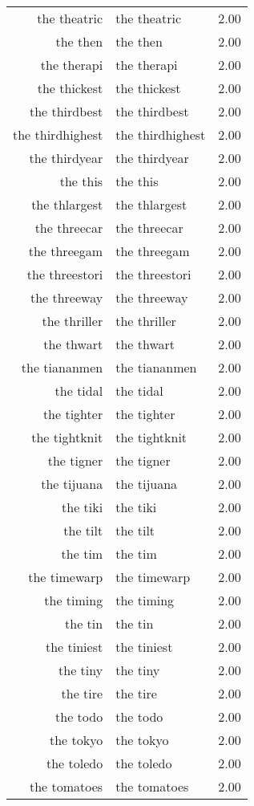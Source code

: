 \begin{table}[ht]
\begin{tabular}{rlr}
  the theatric & the theatric & 2.00 \\ 
  the then & the then & 2.00 \\ 
  the therapi & the therapi & 2.00 \\ 
  the thickest & the thickest & 2.00 \\ 
  the thirdbest & the thirdbest & 2.00 \\ 
  the thirdhighest & the thirdhighest & 2.00 \\ 
  the thirdyear & the thirdyear & 2.00 \\ 
  the this & the this & 2.00 \\ 
  the thlargest & the thlargest & 2.00 \\ 
  the threecar & the threecar & 2.00 \\ 
  the threegam & the threegam & 2.00 \\ 
  the threestori & the threestori & 2.00 \\ 
  the threeway & the threeway & 2.00 \\ 
  the thriller & the thriller & 2.00 \\ 
  the thwart & the thwart & 2.00 \\ 
  the tiananmen & the tiananmen & 2.00 \\ 
  the tidal & the tidal & 2.00 \\ 
  the tighter & the tighter & 2.00 \\ 
  the tightknit & the tightknit & 2.00 \\ 
  the tigner & the tigner & 2.00 \\ 
  the tijuana & the tijuana & 2.00 \\ 
  the tiki & the tiki & 2.00 \\ 
  the tilt & the tilt & 2.00 \\ 
  the tim & the tim & 2.00 \\ 
  the timewarp & the timewarp & 2.00 \\ 
  the timing & the timing & 2.00 \\ 
  the tin & the tin & 2.00 \\ 
  the tiniest & the tiniest & 2.00 \\ 
  the tiny & the tiny & 2.00 \\ 
  the tire & the tire & 2.00 \\ 
  the todo & the todo & 2.00 \\ 
  the tokyo & the tokyo & 2.00 \\ 
  the toledo & the toledo & 2.00 \\ 
  the tomatoes & the tomatoes & 2.00 \\ 

\end{tabular}
\end{table}
